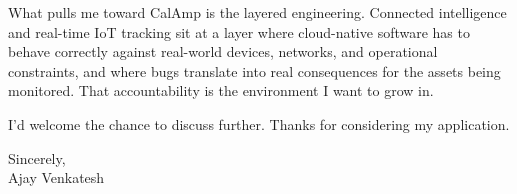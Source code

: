 \documentclass[letterpaper,11pt]{article}
\begin{document}
What pulls me toward CalAmp is the layered engineering. Connected intelligence and real-time IoT tracking sit at a layer where cloud-native software has to behave correctly against real-world devices, networks, and operational constraints, and where bugs translate into real consequences for the assets being monitored. That accountability is the environment I want to grow in.

I'd welcome the chance to discuss further. Thanks for considering my application.

\vspace{12pt}
Sincerely, \\
Ajay Venkatesh
\end{document}
